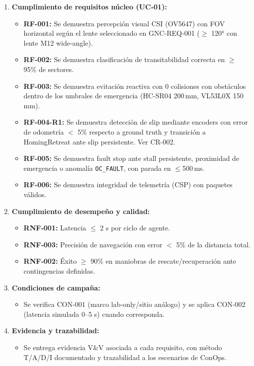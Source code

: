 \begin{enumerate}
    \item \textbf{Cumplimiento de requisitos núcleo (UC‑01):}
    \begin{itemize}
        \item \textbf{RF-001:} Se demuestra percepción visual CSI (OV5647) con FOV horizontal según el lente seleccionado en GNC-REQ-001 ($\ge$ 120° con lente M12 wide-angle).
        \item \textbf{RF‑002:} Se demuestra clasificación de transitabilidad correcta en $\ge$ 95\% de sectores.  
        \item \textbf{RF-003:} Se demuestra evitación reactiva con 0 colisiones con obstáculos dentro de los umbrales de emergencia (HC-SR04 200\,mm, VL53L0X 150\,mm).
        \item \textbf{RF-004-R1:} Se demuestra detección de slip mediante encoders con error de odometría $<$ 5\% respecto a ground truth y transición a HomingRetreat ante slip persistente. Ver CR-002.
        \item \textbf{RF-005:} Se demuestra fault stop ante stall persistente, proximidad de emergencia o anomalía \texttt{OC\_FAULT}, con parada en $\le$500\,ms.
        \item \textbf{RF‑006:} Se demuestra integridad de telemetría (CSP) con paquetes válidos.  
    \end{itemize}

    \item \textbf{Cumplimiento de desempeño y calidad:}
    \begin{itemize}
        \item \textbf{RNF‑001:} Latencia $\le$ 2 s por ciclo de agente.  
        \item \textbf{RNF‑003:} Precisión de navegación con error $<$ 5\% de la distancia total.  
        \item \textbf{RNF‑002:} Éxito $\ge$ 90\% en maniobras de rescate/recuperación ante contingencias definidas.  
    \end{itemize}

    \item \textbf{Condiciones de campaña:}
    \begin{itemize}
        \item Se verifica CON‑001 (marco lab‑only/sitio análogo) y se aplica CON‑002 (latencia simulada 0–5 s) cuando corresponda.  
    \end{itemize}

    \item \textbf{Evidencia y trazabilidad:}
    \begin{itemize}
        \item Se entrega evidencia V\&V asociada a cada requisito, con método T/A/D/I documentado y trazabilidad a los escenarios de ConOps. 
    \end{itemize}
\end{enumerate}

